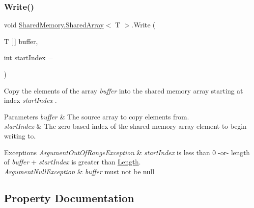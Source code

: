 \subsubsection{\texorpdfstring{Write()}{Write()}\hspace{0.1cm}{\footnotesize\ttfamily [2/2]}}
{\footnotesize\ttfamily void \hyperlink{class_shared_memory_1_1_shared_array}{Shared\+Memory.\+Shared\+Array}$<$ T $>$.Write (\begin{DoxyParamCaption}\item[{T \mbox{[}$\,$\mbox{]}}]{buffer,  }\item[{int}]{start\+Index = {} }\end{DoxyParamCaption})\hspace{0.3cm}{\ttfamily [inline]}}



Copy the elements of the array {\itshape buffer}  into the shared memory array starting at index {\itshape start\+Index} . 


\begin{DoxyParams}{Parameters}
{\em buffer} & The source array to copy elements from.\\
\hline
{\em start\+Index} & The zero-\/based index of the shared memory array element to begin writing to.\\
\hline
\end{DoxyParams}

\begin{DoxyExceptions}{Exceptions}
{\em Argument\+Out\+Of\+Range\+Exception} & {\itshape start\+Index}  is less than 0 -\/or-\/ length of {\itshape buffer}  + {\itshape start\+Index}  is greater than \hyperlink{class_shared_memory_1_1_shared_array_a0fc7647fef708e12caf94e7be58f2c3c}{Length}.\\
\hline
{\em Argument\+Null\+Exception} & {\itshape buffer}  must not be null\\
\hline
\end{DoxyExceptions}


\subsection{Property Documentation}
\mbox{\label{class_shared_memory_1_1_shared_array_a5f1f4e16568b8807a99af211bf8bf2c0}} 
